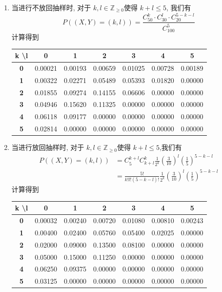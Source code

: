 \documentclass[../main.tex]{subfiles}
\begin{document}
\begin{solution}
  \begin{enumerate}
    \item 当进行不放回抽样时, 对于 \(  k,l \in \mathbb{Z} _{\ge 0 }  \)使得 \(  k+ l  \le 5  \), 我们有    \[
  P\left( \left( X,Y \right)= \left( k,l \right)   \right)  = \frac{C_{50}^{k}\cdot C_{30}^{l}\cdot C_{20}^{5-k-l} }{C_{100}^{5} } 
    \]计算得到  \begin{tabular}{c|cccccc}
\hline
k \textbackslash l & 0 & 1 & 2 & 3 & 4 & 5 \\
\hline
\textbf{0} & 0.00021 & 0.00193 & 0.00659 & 0.01025 & 0.00728 & 0.00189 \\
\textbf{1} & 0.00322 & 0.02271 & 0.05489 & 0.05393 & 0.01820 & 0.00000 \\
\textbf{2} & 0.01855 & 0.09274 & 0.14155 & 0.06606 & 0.00000 & 0.00000 \\
\textbf{3} & 0.04946 & 0.15620 & 0.11325 & 0.00000 & 0.00000 & 0.00000 \\
\textbf{4} & 0.06118 & 0.09177 & 0.00000 & 0.00000 & 0.00000 & 0.00000 \\
\textbf{5} & 0.02814 & 0.00000 & 0.00000 & 0.00000 & 0.00000 & 0.00000 \\
\hline
\end{tabular}
    \item 当进行放回抽样时, 对于 \(  k,l \in \mathbb{Z} _{\ge 0 }  \)使得 \(  k+  l  \le 5  \),我们有 \[
   \begin{aligned}
    P\left( \left( X,Y \right)= \left( k,l \right)   \right)&= C_{5}^{k+ l}C_{k+ l}^{k}\frac{1 }{2^{k} }\left( \frac{3 }{10 }  \right)^{l} \left( \frac{1 }{5 }  \right)^{5-k-l}\\ 
     &   = \frac{5! }{k!l!\left( 5-k-l \right)!  } \frac{1 }{2^{k} }\left( \frac{3 }{10 }  \right)^{l}\left( \frac{1 }{5 }  \right)^{5-k-l}    
   \end{aligned}
    \]计算得到\begin{tabular}{c|cccccc}
\hline
k \textbackslash l & 0 & 1 & 2 & 3 & 4 & 5 \\
\hline
\textbf{0} & 0.00032 & 0.00240 & 0.00720 & 0.01080 & 0.00810 & 0.00243 \\
\textbf{1} & 0.00400 & 0.02400 & 0.05760 & 0.05400 & 0.02025 & 0.00000 \\
\textbf{2} & 0.02000 & 0.09000 & 0.13500 & 0.08100 & 0.00000 & 0.00000 \\
\textbf{3} & 0.05000 & 0.15000 & 0.11250 & 0.00000 & 0.00000 & 0.00000 \\
\textbf{4} & 0.06250 & 0.09375 & 0.00000 & 0.00000 & 0.00000 & 0.00000 \\
\textbf{5} & 0.03125 & 0.00000 & 0.00000 & 0.00000 & 0.00000 & 0.00000 \\
\hline
\end{tabular}
  \end{enumerate}
  
\end{solution}
\end{document}
